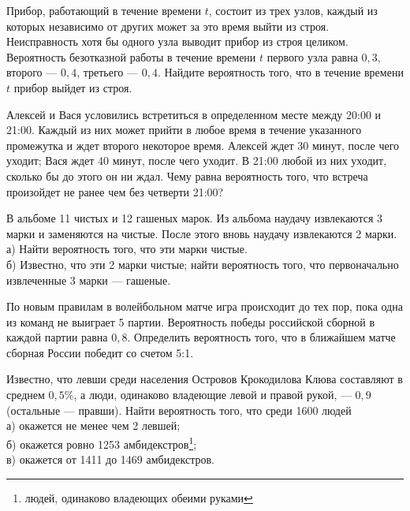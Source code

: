 \newpage\setcounter{zad}{0}



\begin{zkrW}{20}\noindent 
	Прибор, работающий в течение времени $t$, состоит из трех узлов, каждый из которых независимо от других может за это время выйти из строя. Неисправность хотя бы одного узла выводит прибор из строя целиком. Вероятность безотказной работы в течение времени $t$ первого узла равна $0{,}3$, второго --- $0{,}4$, третьего --- $0{,}4$. Найдите вероятность того, что в течение времени $t$ прибор выйдет из строя.
 
\end{zkrW}

\begin{zkrW}{20}\noindent 
	Алексей и Вася условились встретиться в определенном месте между 20:00 и 21:00. Каждый из них может прийти в любое время в течение указанного промежутка и ждет второго некоторое время. Алексей ждет 30 минут, после чего уходит; Вася ждет 40 минут, после чего уходит. В 21:00 любой из них уходит, сколько бы до этого он ни ждал. Чему равна вероятность того, что встреча произойдет не ранее чем без четверти 21:00?
 
\end{zkrW}

\begin{zkrW}{20}\noindent 
	В альбоме 11 чистых и 12 гашеных марок. Из альбома наудачу извлекаются 3 марки и заменяются на чистые. После этого вновь наудачу извлекаются 2 марки. \\ \indent а) Найти вероятность того, что эти марки чистые. \\ \indent б) Известно, что эти 2 марки чистые; найти вероятность того, что первоначально извлеченные 3 марки --- гашеные.
 
\end{zkrW}

\begin{zkrW}{20}\noindent 
	По новым правилам в волейбольном матче игра происходит до тех пор, пока одна из команд не выиграет 5 партии. Вероятность победы российской сборной в каждой партии равна $0{,}8$. Определить вероятность того, что в ближайшем матче сборная России победит со счетом 5:1.
 
\end{zkrW}

\begin{zkrW}{20}\noindent 
	Известно, что левши среди населения Островов Крокодилова Клюва составляют в среднем $0{,}5\%$, а люди, одинаково владеющие левой и правой рукой, --- $0{,}9$ (остальные --- правши). Найти вероятность того, что среди 1600 людей \\ \indent а) окажется не менее чем 2 левшей; \\ \indent б) окажется ровно 1253 амбидекстров\footnote{людей, одинаково владеющих обеими руками}; \\ \indent в) окажется от 1411 до 1469 амбидекстров.
 
\end{zkrW}

